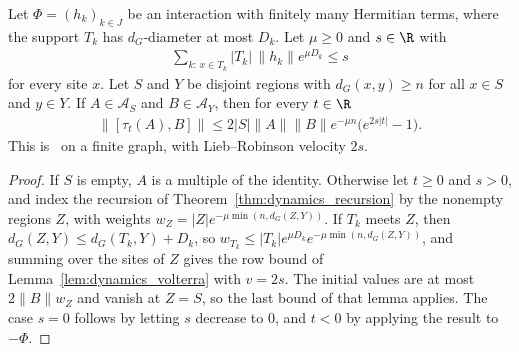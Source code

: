 \begin{theorem}
    \label{thm:dynamics_lieb_robinson_hastings_koma}
    \leanok
    Let $\Phi=(h_k)_{k\in J}$ be an interaction with finitely many Hermitian
    terms, where the support $T_k$ has $d_G$-diameter at most $D_k$. Let $\mu\geq0$
    and $s\in\R$ with
    \begin{align*}
        \sum_{k:\,x\in T_k}\lvert T_k\rvert\,\lVert h_k\rVert e^{\mu D_k}\leq s
    \end{align*}
    for every site $x$. Let $S$ and $Y$ be disjoint regions with $d_G(x,y)\geq n$
    for all $x\in S$ and $y\in Y$. If $A\in\mathcal A_S$ and
    $B\in\mathcal A_Y$, then for every $t\in\R$
    \begin{align*}
        \lVert[\tau_t(A),B]\rVert\leq2\lvert S\rvert\lVert A\rVert\lVert B\rVert
            e^{-\mu n}\bigl(e^{2s|t|}-1\bigr).
    \end{align*}
    This is~\cite[Theorem~A.2]{HastingsKoma2006SpectralGap} on a finite graph,
    with Lieb--Robinson velocity $2s$.
\end{theorem}
\begin{proof}\leanok
    If $S$ is empty, $A$ is a multiple of the identity. Otherwise let $t\geq0$
    and $s>0$, and index the recursion of
    Theorem~\ref{thm:dynamics_recursion} by the nonempty regions $Z$, with weights
    $w_Z=\lvert Z\rvert e^{-\mu\min(n,d_G(Z,Y))}$. If $T_k$ meets $Z$, then
    $d_G(Z,Y)\leq d_G(T_k,Y)+D_k$, so $w_{T_k}\leq\lvert T_k\rvert e^{\mu D_k}
    e^{-\mu\min(n,d_G(Z,Y))}$, and summing over the sites of $Z$ gives the row
    bound of Lemma~\ref{lem:dynamics_volterra} with $v=2s$. The initial values
    are at most $2\lVert B\rVert w_Z$ and vanish at $Z=S$, so the last bound of
    that lemma applies. The case $s=0$ follows by letting $s$ decrease to $0$,
    and $t<0$ by applying the result to $-\Phi$.
\end{proof}


